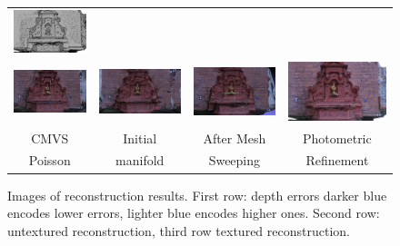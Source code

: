 \begin{figure}[t]
\begin{tabular}{cccc}
\includegraphics[width=0.25\columnwidth]{./img/photo_mesh_crop}\\
\includegraphics[width=0.25\columnwidth]{./img/poissonTex}&
\includegraphics[width=0.25\columnwidth]{./img/first_tex}&
\includegraphics[width=0.25\columnwidth]{./img/myresTex}&
\includegraphics[width=0.25\columnwidth]{./img/photo_mesh_rgb_crop}\\
CMVS &
Initial&
After Mesh&
Photometric\\
Poisson &
manifold&
 Sweeping&
Refinement\\
\end{tabular}
\caption{Images of reconstruction results. First row: depth errors darker blue encodes lower errors, lighter blue encodes higher ones. Second row: untextured reconstruction, third row textured reconstruction.}
\label{fig:fountainIm}
\end{figure}




